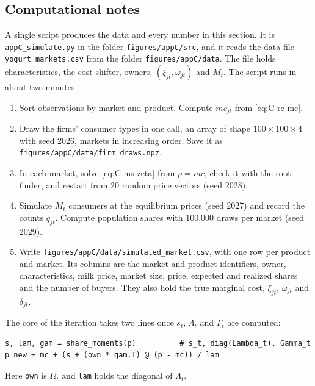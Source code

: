 \subsection{Computational notes}

A single script produces the data and every number in this section. It is \texttt{appC\_simulate.py} in the folder
\texttt{figures/appC/src}, and it reads the data file \texttt{yogurt\_markets.csv} from the folder
\texttt{figures/appC/data}. The file holds characteristics, the cost shifter, owners, $(\xi_{jt}, \omega_{jt})$ and
$M_t$. The script runs in about two minutes.
\begin{enumerate}
  \item Sort observations by market and product. Compute $mc_{jt}$ from \eqref{eq:C-rc-mc}.
  \item Draw the firms' consumer types in one call, an array of shape $100 \times 100 \times 4$ with seed 2026, markets
  in increasing order. Save it as \texttt{figures/appC/data/firm\_draws.npz}.
  \item In each market, solve \eqref{eq:C-ms-zeta} from $p = mc$, check it with the root finder, and restart from 20 random
  price vectors (seed 2028).
  \item Simulate $M_t$ consumers at the equilibrium prices (seed 2027) and record the counts $q_{jt}$. Compute population
  shares with 100,000 draws per market (seed 2029).
  \item Write \texttt{figures/appC/data/simulated\_market.csv}, with one row per product and market. Its columns are
  the market and product identifiers, owner, characteristics, milk price, market size, price, expected and realized
  shares and the number of buyers. They also hold the true marginal cost, $\xi_{jt}$, $\omega_{jt}$ and $\delta_{jt}$.
\end{enumerate}
The core of the iteration takes two lines once $s_t$, $\Lambda_t$ and $\Gamma_t$ are computed:
\begin{verbatim}
s, lam, gam = share_moments(p)          # s_t, diag(Lambda_t), Gamma_t
p_new = mc + (s + (own * gam.T) @ (p - mc)) / lam
\end{verbatim}
Here \texttt{own} is $\Omega_t$ and \texttt{lam} holds the diagonal of $\Lambda_t$.

